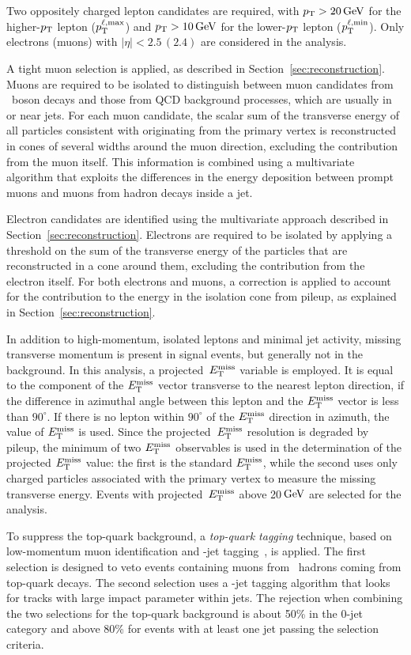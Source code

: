 \documentclass[11pt,twoside,a4paper,cmspaper,final,collab]{cms-tdr}
\begin{document}
Two oppositely charged lepton candidates are required, with $p_{\mathrm{T}} > 20\,\text{Ge\hspace{-.08em}V}$ for
the higher-$p_{\mathrm{T}}$ lepton ($p_{\mathrm{T}}^{\ell,\mathrm{max}}$) and $p_{\mathrm{T}} > 10\,\text{Ge\hspace{-.08em}V}$ for the lower-$p_{\mathrm{T}}$ lepton ($p_{\mathrm{T}}^{\ell,\mathrm{min}}$).
Only electrons (muons) with $|\eta| < 2.5 \, (2.4)$ are considered in the analysis.

A tight muon selection is applied,  as described in
Section~\ref{sec:reconstruction}. Muons are required to be isolated to
distinguish between muon candidates from \PW\ boson decays and those from QCD
background processes, which are usually in or near jets. For each muon
candidate, the scalar sum of the transverse energy of all particles
consistent with originating from the primary vertex is reconstructed in
cones of several widths around the muon direction, excluding the
contribution from the muon itself. This information is combined using a
multivariate algorithm that exploits the differences in the
energy deposition between prompt muons and muons from hadron decays inside
a jet.

Electron candidates are identified using the multivariate approach described in
Section~\ref{sec:reconstruction}. Electrons are required to be isolated by
applying a threshold on the sum of the transverse energy of the particles
that are reconstructed in a cone around them, excluding the contribution from
the electron itself.
For both electrons and muons, a correction is applied to account for the
contribution to the energy in the isolation cone from pileup, as
explained in Section~\ref{sec:reconstruction}.

In addition to high-momentum, isolated leptons and minimal jet activity, missing
transverse momentum is present in signal events, but generally not in the background.
In this analysis, a projected~$E_{\mathrm{T}}^{\text{miss}}$ variable is employed. It is
equal to the component of the $E_{\mathrm{T}}^{\text{miss}}$ vector transverse to the nearest lepton direction, if the
difference in azimuthal angle between this lepton and the $E_{\mathrm{T}}^{\text{miss}}$ vector is less
than $90^\circ$. If there is no lepton within  $90^\circ$ of the $E_{\mathrm{T}}^{\text{miss}}$ direction  in
azimuth, the value of $E_{\mathrm{T}}^{\text{miss}}$ is used.
Since the projected~$E_{\mathrm{T}}^{\text{miss}}$ resolution is degraded
by pileup, the minimum of two $E_{\mathrm{T}}^{\text{miss}}$ observables is used in the determination of the projected $E_{\mathrm{T}}^{\text{miss}}$ value:
the first is the standard
$E_{\mathrm{T}}^{\text{miss}}$, while the second uses only charged particles associated with the primary vertex to measure the missing transverse energy.
Events with projected~$E_{\mathrm{T}}^{\text{miss}}$ above 20$\,\text{Ge\hspace{-.08em}V}$ are selected for the analysis.

To suppress the top-quark background, a \textit{top-quark tagging} technique, based
on low-momentum muon identification and \cPqb-jet tagging~\cite{CMS-PAS-BTV-12-001}, is applied. The first
selection is designed to veto events containing muons from \cPqb\ hadrons coming from top-quark decays.
The second selection uses a \cPqb-jet tagging algorithm that looks for tracks with large impact parameter
within jets. The rejection when combining the two selections for the top-quark background is about 50\% in the 0-jet
category and above 80\% for events with at least one jet passing the selection criteria.
\end{document}
